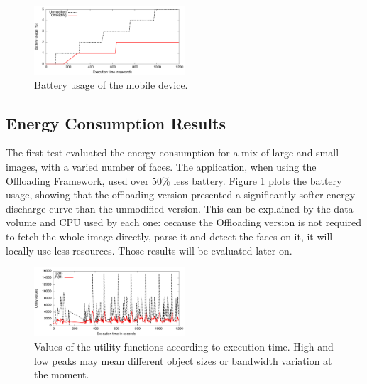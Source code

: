 \documentclass[10pt, conference, letterpaper]{IEEEtran}
\begin{document}
\begin{figure}[t]
  \centering
  \includegraphics[width=0.5\textwidth]{results/plots/executions.png}
  \caption{Battery usage of the mobile device.}
  \label{fig:batteryusage}
\end{figure}

  \subsection{Energy Consumption Results}

The first test evaluated the energy consumption for a mix of large and small images, with a varied number of faces. The application, when using the Offloading Framework, used over 50\% less battery. Figure \ref{fig:batteryusage} plots the battery usage, showing that the offloading version presented a significantly softer energy discharge curve than the unmodified version. This can be explained by the data volume and CPU used by each one: cecause the Offloading version is not required to fetch the whole image directly, parse it and detect the faces on it, it will locally use less resources. Those results will be evaluated later on.


\begin{figure}[t]
  \centering
  \includegraphics[width=0.5\textwidth]{results/plots/utility-fluctuation/executions.png}
  \caption{Values of the utility functions according to execution time. High and low peaks may mean different object sizes or bandwidth variation at the moment.}
  \label{fig:utilityplot}
\end{figure}
\end{document}

